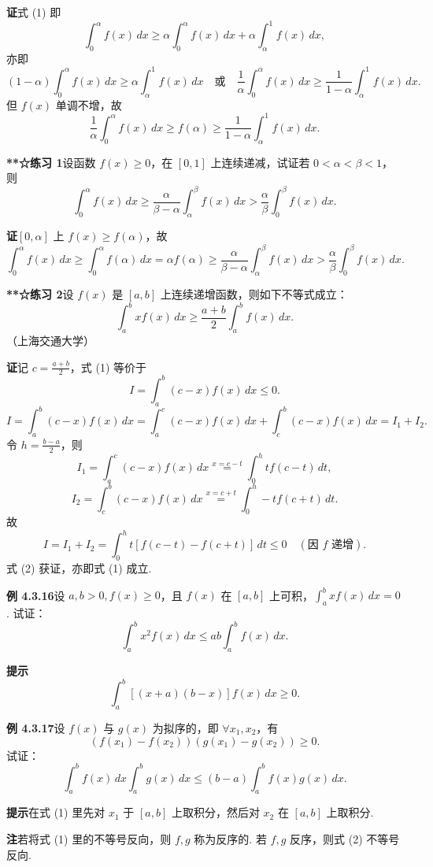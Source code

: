 \documentclass[UTF8, 12pt, fontset=fandol, oneside]{ctexart}
\begin{document}
\noindent\textbf{证}\quad 式 (1) 即
\[
\int_0^\alpha f(x)\,dx\ge
\alpha\int_0^\alpha f(x)\,dx+\alpha\int_\alpha^1 f(x)\,dx,
\]
亦即
\[
(1-\alpha)\int_0^\alpha f(x)\,dx\ge
\alpha\int_\alpha^1 f(x)\,dx
\quad\text{或}\quad
\frac1\alpha\int_0^\alpha f(x)\,dx
\ge\frac1{1-\alpha}\int_\alpha^1 f(x)\,dx.
\]
但 $f(x)$ 单调不增，故
\[
\frac1\alpha\int_0^\alpha f(x)\,dx
\ge f(\alpha)\ge
\frac1{1-\alpha}\int_\alpha^1 f(x)\,dx.
\]

\noindent\textbf{**☆练习 1}\quad 设函数 $f(x)\ge0$，在 $[0,1]$ 上连续递减，试证若 $0<\alpha<\beta<1$，则
\[
\int_0^\alpha f(x)\,dx\ge
\frac{\alpha}{\beta-\alpha}\int_\alpha^\beta f(x)\,dx
>\frac{\alpha}{\beta}\int_0^\beta f(x)\,dx.
\]

\noindent\textbf{证}\quad $[0,\alpha]$ 上 $f(x)\ge f(\alpha)$，故
\[
\int_0^\alpha f(x)\,dx
\ge\int_0^\alpha f(\alpha)\,dx
=\alpha f(\alpha)
\ge\frac{\alpha}{\beta-\alpha}\int_\alpha^\beta f(x)\,dx
>\frac{\alpha}{\beta}\int_0^\beta f(x)\,dx.
\]

\noindent\textbf{**☆练习 2}\quad 设 $f(x)$ 是 $[a,b]$ 上连续递增函数，则如下不等式成立：
\[
\int_a^b xf(x)\,dx\ge\frac{a+b}{2}\int_a^b f(x)\,dx.
\tag{1}
\]
（上海交通大学）

\noindent\textbf{证}\quad 记 $c=\frac{a+b}{2}$，式 (1) 等价于
\[
I=\int_a^b(c-x)f(x)\,dx\le0.
\tag{2}
\]
\[
I=\int_a^b(c-x)f(x)\,dx
=\int_a^c(c-x)f(x)\,dx+\int_c^b(c-x)f(x)\,dx
=I_1+I_2.
\]
令 $h=\frac{b-a}{2}$，则
\[
I_1=\int_a^c(c-x)f(x)\,dx
\overset{x=c-t}{=}
\int_0^h t f(c-t)\,dt,
\]
\[
I_2=\int_c^b(c-x)f(x)\,dx
\overset{x=c+t}{=}
\int_0^h -t f(c+t)\,dt.
\]
故
\[
I=I_1+I_2=\int_0^h t[f(c-t)-f(c+t)]\,dt\le0\quad(\text{因 }f\text{ 递增}).
\]
式 (2) 获证，亦即式 (1) 成立.

\noindent\textbf{例 4.3.16}\quad 设 $a,b>0,f(x)\ge0$，且 $f(x)$ 在 $[a,b]$ 上可积，$\int_a^b xf(x)\,dx=0$. 试证：
\[
\int_a^b x^2 f(x)\,dx\le ab\int_a^b f(x)\,dx.
\]

\noindent\textbf{提示}\quad
\[
\int_a^b[(x+a)(b-x)]f(x)\,dx\ge0.
\]

\noindent\textbf{例 4.3.17}\quad 设 $f(x)$ 与 $g(x)$ 为拟序的，即 $\forall x_1,x_2$，有
\[
\left(f(x_1)-f(x_2)\right)\left(g(x_1)-g(x_2)\right)\ge0.
\tag{1}
\]
试证：
\[
\int_a^b f(x)\,dx\int_a^b g(x)\,dx
\le(b-a)\int_a^b f(x)g(x)\,dx.
\tag{2}
\]

\noindent\textbf{提示}\quad 在式 (1) 里先对 $x_1$ 于 $[a,b]$ 上取积分，然后对 $x_2$ 在 $[a,b]$ 上取积分.

\noindent\textbf{注}\quad 若将式 (1) 里的不等号反向，则 $f,g$ 称为反序的. 若 $f,g$ 反序，则式 (2) 不等号反向.
\end{document}
